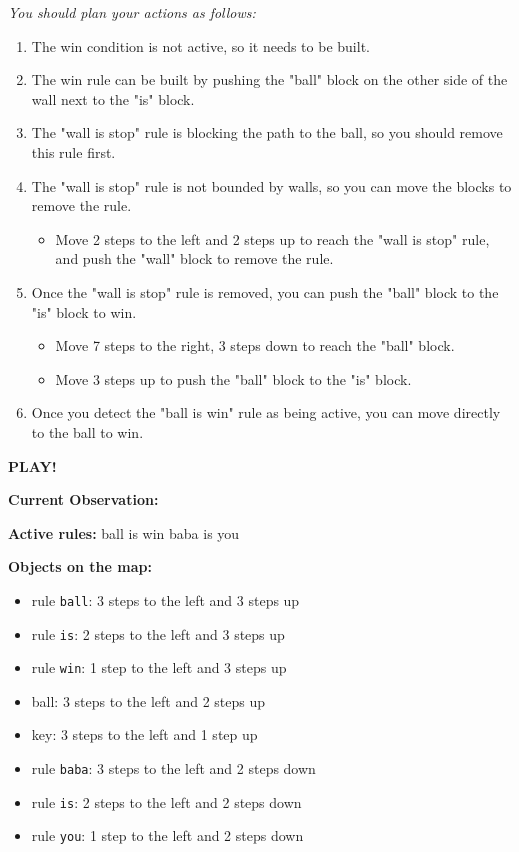 \begin{GreenBox}[frametitle={\textbf{Iteration 2 Baba-is-ai Prompt}}]
\textit{You should plan your actions as follows:}
\begin{enumerate}
    \item The win condition is not active, so it needs to be built.
    \item The win rule can be built by pushing the "ball" block on the other side of the wall next to the "is" block.
    \item The "wall is stop" rule is blocking the path to the ball, so you should remove this rule first.
    \item The "wall is stop" rule is not bounded by walls, so you can move the blocks to remove the rule.
    \begin{itemize}
        \item Move 2 steps to the left and 2 steps up to reach the "wall is stop" rule, and push the "wall" block to remove the rule.
    \end{itemize}
    \item Once the "wall is stop" rule is removed, you can push the "ball" block to the "is" block to win.
    \begin{itemize}
        \item Move 7 steps to the right, 3 steps down to reach the "ball" block.
        \item Move 3 steps up to push the "ball" block to the "is" block.
    \end{itemize}
    \item Once you detect the "ball is win" rule as being active, you can move directly to the ball to win.
\end{enumerate}

\textbf{PLAY!}

\textbf{Current Observation:}

\textbf{Active rules:}  
ball is win  
baba is you  

\textbf{Objects on the map:}
\begin{itemize}
    \item rule \texttt{ball}: 3 steps to the left and 3 steps up
    \item rule \texttt{is}: 2 steps to the left and 3 steps up
    \item rule \texttt{win}: 1 step to the left and 3 steps up
    \item ball: 3 steps to the left and 2 steps up
    \item key: 3 steps to the left and 1 step up
    \item rule \texttt{baba}: 3 steps to the left and 2 steps down
    \item rule \texttt{is}: 2 steps to the left and 2 steps down
    \item rule \texttt{you}: 1 step to the left and 2 steps down
\end{itemize}


\end{GreenBox}
